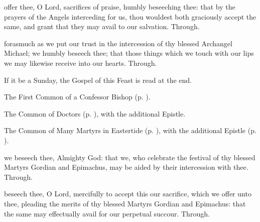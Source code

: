 \secret
{} offer thee, O Lord, sacrifices of praise, humbly beseeching thee: that by the prayers of the Angels interceding for us, thou wouldest both graciously accept the same, and grant that they may avail to our salvation. Through.


\postcommunion
{} forasmuch as we put our trust in the intercession of thy blessed Archangel Michael; we humbly beseech thee; that those things which we touch with our lips we may likewise receive into our hearts. Through.

\begin{rubric}
	If it be a Sunday, the Gospel of this Feast is read at the end.
\end{rubric}




\begin{rubric}
	The First Common of a Confessor Bishop (p. \pageref{CommonConfessorBishopI}).
\end{rubric}



\begin{rubric}
	The Common of Doctors (p. \pageref{CommonDoctors}), with the additional Epistle.
\end{rubric}



\begin{rubric}
	The Common of Many Martyrs in Eastertide (p. \pageref{CommonMartyrsEaster}), with the additional Epistle (p. \pageref{Revelation191}).
\end{rubric}

\collect
{} we beseech thee, Almighty God: that we, who celebrate the festival of thy blessed Martyrs Gordian and Epimachus, may be aided by their intercession with thee. Through.

\secret
{} beseech thee, O Lord, mercifully to accept this our sacrifice, which we offer unto thee, pleading the merits of thy blessed Martyrs Gordian and Epimachus: that the same may effectually avail for our perpetual succour. Through.

